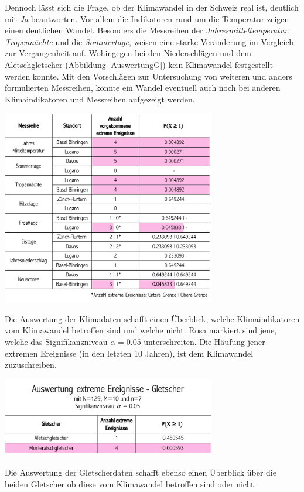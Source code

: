 \begin{refsection}
Dennoch lässt sich die Frage, ob der Klimawandel in der Schweiz real ist, deutlich mit {\em Ja} beantworten. Vor allem die Indikatoren rund um die Temperatur zeigen einen deutlichen Wandel. Besonders die Messreihen der {\em Jahresmitteltemperatur}, {\em Tropennächte} und die {\em Sommertage}, weisen eine starke Veränderung im Vergleich zur Vergangenheit auf. Wohingegen bei den Niederschlägen und dem Aletschgletscher (Abbildung \ref{AuswertungG}) kein Klimawandel festgestellt werden konnte. Mit den Vorschlägen zur Untersuchung von weiteren und anders formulierten Messreihen, könnte ein Wandel eventuell auch noch bei anderen Klimaindikatoren und Messreihen aufgezeigt werden.


\begin{table}
\centering
\includegraphics[width=0.7\textwidth]{extrem/AuswertungK.pdf}
\caption{Die Auswertung der Klimadaten schafft einen Überblick, welche Klimaindikatoren vom Klimawandel betroffen sind und welche nicht. Rosa markiert sind jene, welche das Signifikanzniveau $\alpha=0.05$ unterschreiten. Die Häufung jener extremen Ereignisse (in den letzten 10 Jahren), ist dem Klimawandel zuzuschreiben.}
\label{AuswertungK}
\end{table}


\begin{table}
\centering
\includegraphics[width=0.7\textwidth]{extrem/AuswertungG.pdf}
\caption{Die Auswertung der Gletscherdaten schafft ebenso einen Überblick über die beiden Gletscher ob diese vom Klimawandel betroffen sind oder nicht.}
\label{AuswertungG}
\end{table}


\end{refsection}
